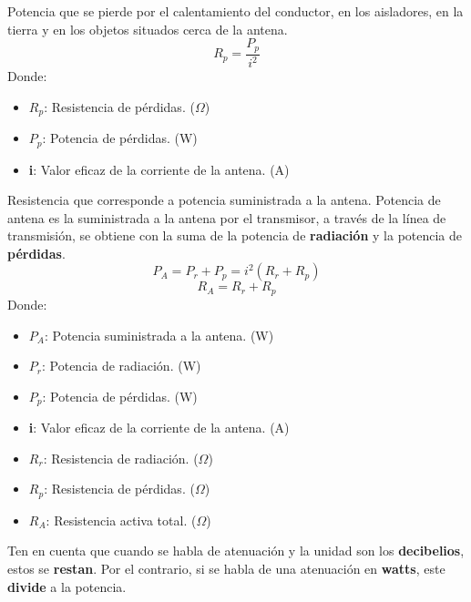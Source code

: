 \documentclass[
	12pt, %
	fleqn, %
	a4paper, %
	oneside, %
]{LegrandOrangeBook}
\begin{document}
\begin{definition}
Potencia que se pierde por el calentamiento del conductor, en los aisladores, en la tierra y en los objetos situados cerca de la antena.
\begin{equation*}
R_p=\frac{P_p}{i^2}
\label{eq:resistencia perdidas}
\end{equation*}
Donde:
\begin{itemize}
\item $R_p$: Resistencia de pérdidas. ($\Omega$)
\item $P_p$: Potencia de pérdidas. (W)
\item \textbf{i}: Valor eficaz de la corriente de la antena. (A)
\end{itemize}
\end{definition}
\begin{definition}
Resistencia que corresponde a potencia suministrada a la antena. Potencia de antena es la suministrada a la antena por el transmisor, a través de la línea de transmisión, se obtiene con la suma de la potencia de \textbf{radiación} y la potencia de \textbf{pérdidas}.
\begin{equation}
P_A=P_r+P_p=i^2\left(R_r+R_p\right)
\label{eq:potencia antena}
\end{equation}
\begin{equation}
R_A=R_r+R_p
\end{equation}
Donde:
\begin{itemize}
\item $P_A$: Potencia suministrada a la antena. (W)
\item $P_r$: Potencia de radiación. (W)
\item $P_p$: Potencia de pérdidas. (W)
\item \textbf{i}: Valor eficaz de la corriente de la antena. (A)
\item $R_r$: Resistencia de radiación. ($\Omega$)
\item $R_p$: Resistencia de pérdidas. ($\Omega$)
\item $R_A$: Resistencia activa total. ($\Omega$)
\end{itemize}
\end{definition}
\begin{remark}
Ten en cuenta que cuando se habla de atenuación y la unidad son los \textbf{decibelios}, estos se \textbf{restan}. Por el contrario, si se habla de una atenuación en \textbf{watts}, este \textbf{divide} a la potencia.
\end{remark}
\end{document}
